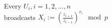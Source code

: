 \documentclass[varwidth,convert={size=1000x}]{standalone}
\begin{document}
Every $U_i, i = 1, 2, \dots, n$\\
broadcasts $X_i := (\frac{z_{i+1}}{z_{i-1}})^{r_i} \mod p$
\end{document}
